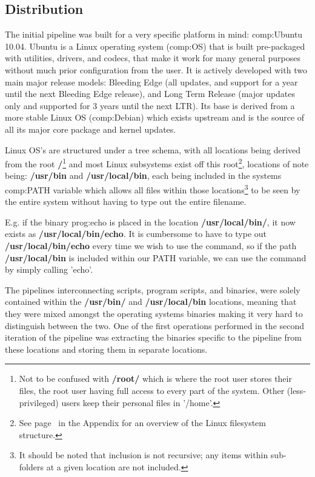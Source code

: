 \subsection{Distribution}

The initial pipeline was built for a very specific platform in mind: \gls{comp:Ubuntu} 10.04. Ubuntu is a Linux operating system (\gls{comp:OS}) that is built pre-packaged with utilities, drivers, and codecs, that make it work for many general purposes without much prior configuration from the user. It is actively developed with two main major release models: Bleeding Edge (all updates, and support for a year until the next Bleeding Edge release), and Long Term Release (major updates only and supported for 3 years until the next LTR).  Its base is derived from a more stable Linux OS (\gls{comp:Debian}) which exists upstream and is the source of all its major core package and kernel updates.

Linux OS's are structured under a tree schema, with all locations being derived from the root \textbf{/}\footnote{Not to be confused with \textbf{/root/} which is where the root user stores their files, the root user having full access to every part of the system. Other (less-privileged) users keep their personal files in '/home'.} and most Linux subsystems exist off this root\footnote{See page~\pageref{ref:app:semaphores} in the Appendix for an overview of the Linux filesystem structure.}, locations of note being: \textbf{/usr/bin} and \textbf{/usr/local/bin}, each being included in the systems \gls{comp:PATH} variable which allows all files within those locations\footnote{It should be noted that inclusion is not recursive; any items within sub-folders at a given location are not included.} to be seen by the entire system without having to type out the entire filename.

E.g. if the binary \gls{prog:echo} is placed in the location \textbf{/usr/local/bin/}, it now exists as \textbf{/usr/local/bin/echo}. It is cumbersome to have to type out \textbf{/usr/local/bin/echo} every time we wish to use the command, so if the path \textbf{/usr/local/bin} is included within our PATH variable, we can use the command by simply calling 'echo'.

The pipelines interconnecting scripts, program scripts, and binaries, were solely contained within the \textbf{/usr/bin/} and \textbf{/usr/local/bin} locations, meaning that they were mixed amongst the operating systems binaries making it very hard to distinguish between the two. One of the first operations performed in the second iteration of the pipeline was extracting the binaries specific to the pipeline from these locations and storing them in separate locations. 


